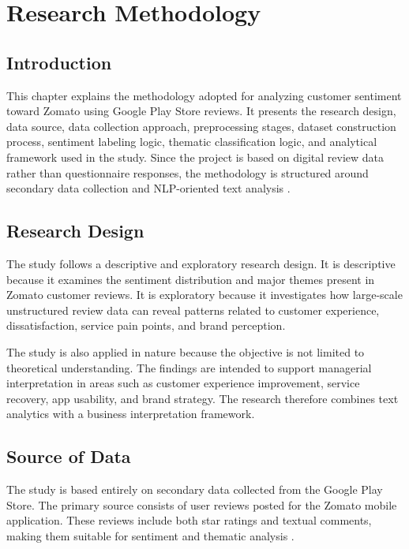 \chapter{Research Methodology}

\section{Introduction}

This chapter explains the methodology adopted for analyzing customer sentiment toward Zomato using Google Play Store reviews. It presents the research design, data source, data collection approach, preprocessing stages, dataset construction process, sentiment labeling logic, thematic classification logic, and analytical framework used in the study. Since the project is based on digital review data rather than questionnaire responses, the methodology is structured around secondary data collection and NLP-oriented text analysis \cite{pagano2013,martin2017}.

\section{Research Design}

The study follows a descriptive and exploratory research design. It is descriptive because it examines the sentiment distribution and major themes present in Zomato customer reviews. It is exploratory because it investigates how large-scale unstructured review data can reveal patterns related to customer experience, dissatisfaction, service pain points, and brand perception.

The study is also applied in nature because the objective is not limited to theoretical understanding. The findings are intended to support managerial interpretation in areas such as customer experience improvement, service recovery, app usability, and brand strategy. The research therefore combines text analytics with a business interpretation framework.

\section{Source of Data}

The study is based entirely on secondary data collected from the Google Play Store. The primary source consists of user reviews posted for the Zomato mobile application. These reviews include both star ratings and textual comments, making them suitable for sentiment and thematic analysis \cite{pagano2013,guzman2017}.

